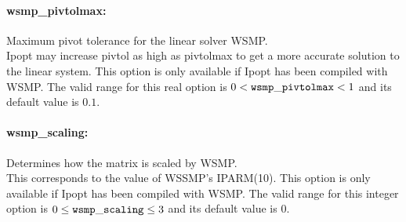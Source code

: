 \paragraph{wsmp\_pivtolmax:}\label{sec:wsmp_pivtolmax} Maximum pivot tolerance for the linear solver WSMP. $\;$ \\
 Ipopt may increase pivtol as high as pivtolmax to
get a more accurate solution to the linear
system.  This option is only available if Ipopt
has been compiled with WSMP. The valid range for this real option is 
$0 <  {\tt wsmp\_pivtolmax } <  1$
and its default value is $0.1$.


\paragraph{wsmp\_scaling:}\label{sec:wsmp_scaling} Determines how the matrix is scaled by WSMP. $\;$ \\
 This corresponds to the value of WSSMP's
IPARM(10). This option is only available if Ipopt
has been compiled with WSMP. The valid range for this integer option is
$0 \le {\tt wsmp\_scaling } \le 3$
and its default value is $0$.

